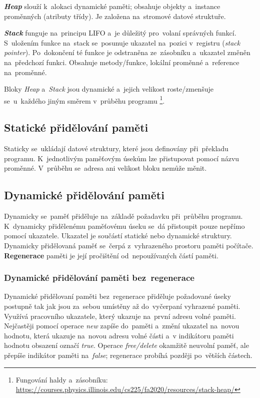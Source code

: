 \emph{\textbf{Heap}} slouží k~alokaci dynamické paměti; obsahuje objekty a~instance proměnných (atributy třídy). Je založena na~stromové datové struktuře.

\emph{\textbf{Stack}} funguje na~principu LIFO a~je důležitý pro~volaní správných funkcí. S~uložením funkce na~stack se~posunuje ukazatel na~pozici v~registru (\emph{stack pointer}). Po~dokončení té funkce je odstraněna ze~zásobníku a~ukazatel změněn na~předchozí funkci. Obsahuje metody/funkce, lokální proměnné a~reference na~proměnné.

Bloky \emph{Heap} a~\emph{Stack} jsou dynamické a~jejich velikost roste/zmenšuje se~u~každého jiným směrem v~průběhu programu%
\footnote{Fungování haldy a~zásobníku: \url{https://courses.physics.illinois.edu/cs225/fa2020/resources/stack-heap/}}.

\subsection{Statické přidělování paměti}

Staticky se~ukládají datové struktury, které jsou definovány při~překladu programu. K~jednotlivým paměťovým úsekům lze přistupovat pomocí názvu proměnné. V~průběhu se~adresa ani velikost bloku nemůže měnit.

\subsection{Dynamické přidělování paměti}

Dynamicky se~paměť přiděluje na~základě požadavku při~průběhu programu. K~dynamicky přidělenému paměťovému úseku se~dá přistoupit pouze nepřímo pomocí ukazatele. Ukazatel je součástí statické nebo dynamické struktury. Dynamicky přidělovaná paměť se~čerpá z~vyhrazeného prostoru paměti počítače. \textbf{Regenerace} paměti je její pročištění od~nepoužívaných částí paměti.

\subsubsection{Dynamické přidělování paměti bez~regenerace}

Dynamické přidělovaní paměti bez~regenerace přiděluje požadované úseky postupně tak jak jsou za~sebou umístěny až do~vyčerpaní vyhrazené paměti. Využívá pracovního ukazatele, který ukazuje na~první adresu volné paměti. Nejčastěji pomocí operace \emph{new} zapíše do~paměti a~změní ukazatel na~novou hodnotu, která ukazuje na~novou adresu volné části a~v indikátoru paměti hodnotu obsazení označí \emph{true}. Operace \emph{free/delete} okamžitě neuvolní paměť, ale přepíše indikátor paměti na~\emph{false}; regenerace probíhá později po~větších částech.

